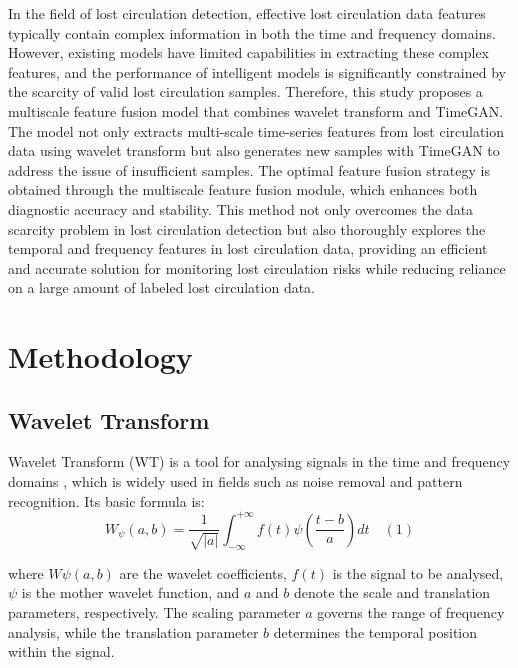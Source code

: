 \documentclass[journal,article,submit,pdftex,moreauthors]{Definitions/mdpi}
\begin{document}
In the field of lost circulation detection, effective lost circulation data features typically contain complex information in both the time and frequency domains. However, existing models have limited capabilities in extracting these complex features, and the performance of intelligent models is significantly constrained by the scarcity of valid lost circulation samples. Therefore, this study proposes a multiscale feature fusion model that combines wavelet transform and TimeGAN. The model not only extracts multi-scale time-series features from lost circulation data using wavelet transform but also generates new samples with TimeGAN to address the issue of insufficient samples. The optimal feature fusion strategy is obtained through the multiscale feature fusion module, which enhances both diagnostic accuracy and stability. This method not only overcomes the data scarcity problem in lost circulation detection but also thoroughly explores the temporal and frequency features in lost circulation data, providing an efficient and accurate solution for monitoring lost circulation risks while reducing reliance on a large amount of labeled lost circulation data.
\section{Methodology}
\subsection{Wavelet Transform}

Wavelet Transform (WT) is a tool for analysing signals in the time and frequency domains \cite{Grossmann1984}, which is widely used in fields such as noise removal and pattern recognition. Its basic formula is:
\[{{W}_{\psi }}(a,b)=\frac{1}{\sqrt{|a|}}\mathop{\int }_{-\infty }^{+\infty }f(t)\psi (\frac{t-b}{a})dt\quad (1)\]

where $W\psi(a, b)$ are the wavelet coefficients, $f(t)$ is the signal to be analysed, $\psi$ is the mother wavelet function, and $a$ and $b$ denote the scale and translation parameters, respectively. The scaling parameter $a$ governs the range of frequency analysis, while the translation parameter $b$ determines the temporal position within the signal.
\end{document}
